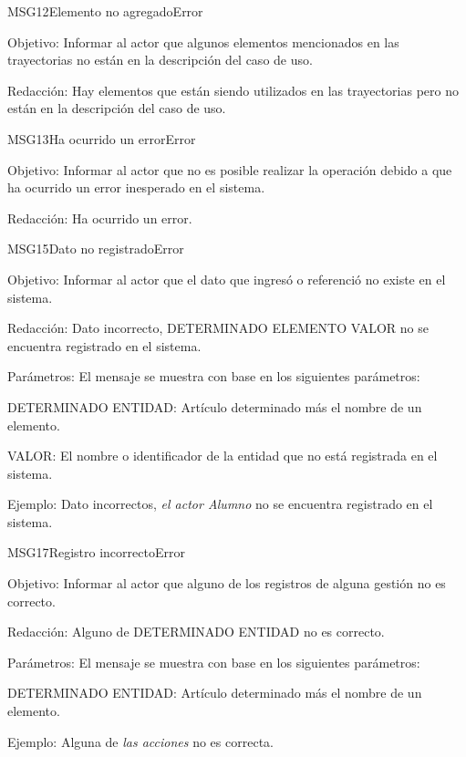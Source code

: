 \begin{mensaje}{MSG12}{Elemento no agregado}{Error}
    \item[Objetivo:] Informar al actor que algunos elementos mencionados en las trayectorias no están en la descripción del caso de uso.
    \item[Redacción:] Hay elementos que están siendo utilizados en las trayectorias pero no están en la descripción del caso de uso.
\end{mensaje}
\begin{mensaje}{MSG13}{Ha ocurrido un error}{Error}
    \item[Objetivo:] Informar al actor que no es posible realizar la operación debido a que ha ocurrido un error inesperado en el sistema.
    \item[Redacción:] Ha ocurrido un error.
\end{mensaje}
\begin{mensaje}{MSG15}{Dato no registrado}{Error}
    \item[Objetivo:] Informar al actor que el dato que ingresó o referenció no existe en el sistema.
    \item[Redacción:] Dato incorrecto, DETERMINADO ELEMENTO VALOR no se encuentra registrado en el sistema.
    \item[Parámetros:] El mensaje se muestra con base en los siguientes parámetros:
    \begin{Citemize}
	\item DETERMINADO ENTIDAD: Artículo determinado más el nombre de un elemento.
	\item VALOR: El nombre o identificador de la entidad que no está registrada en el sistema.
    \end{Citemize}
    \item[Ejemplo:] Dato incorrectos, { \em el actor Alumno} no se encuentra registrado en el sistema.
\end{mensaje}
\begin{mensaje}{MSG17}{Registro incorrecto}{Error}
    \item[Objetivo:] Informar al actor que alguno de los registros de alguna gestión no es correcto.
    \item[Redacción:] Alguno de DETERMINADO ENTIDAD no es correcto.
    \item[Parámetros:] El mensaje se muestra con base en los siguientes parámetros:
    \begin{Citemize}
	\item DETERMINADO ENTIDAD: Artículo determinado más el nombre de un elemento.
    \end{Citemize}
    \item[Ejemplo:] Alguna de {\em las acciones} no es correcta.
\end{mensaje}
